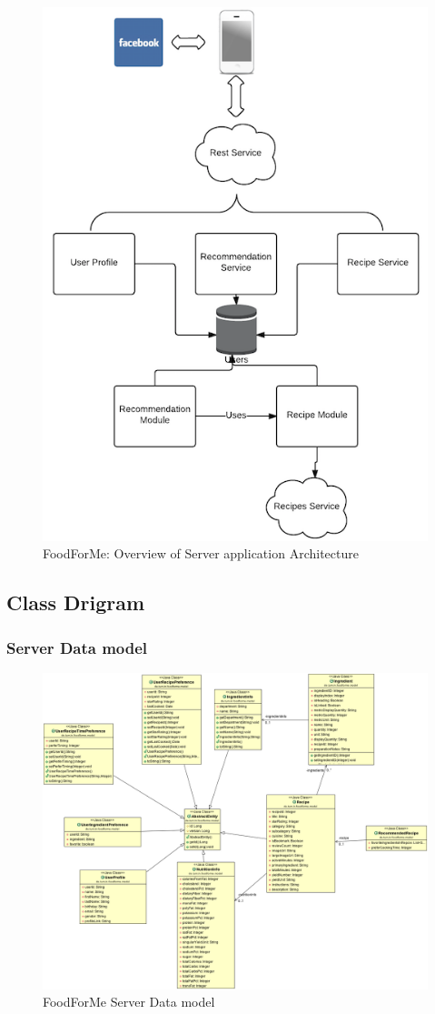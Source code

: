 	\begin{figure}[h]
	   	\centering
	   	\includegraphics[width=.55\linewidth]{figures/ch4_architechture_diagram.png}
	   	\caption{FoodForMe: Overview of Server application Architecture}
	   	\label{fig:ch4_architechture_diagram.png}
	   \end{figure}
	   
\subsection{Class Drigram}

\subsubsection{Server Data model}
\begin{figure}[h]
	\centering
	\includegraphics[width=1\linewidth]{figures/ch4_erd_and_class_dig/ch4_database_model.png}
	\caption{FoodForMe Server Data model}
	\label{fig:ch4_database_model}
\end{figure}
\newpage
